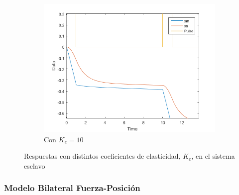 \documentclass[a4paper, fontsize=11pt]{scrartcl} %
\numberwithin{equation}{section} %
\numberwithin{figure}{section} %
\numberwithin{table}{section} %
\begin{document}
\begin{figure}[h!]
\begin{subfigure}[t]{.5\textwidth}
			\includegraphics[width=1\linewidth]{images/Ke10.PNG}
			\caption{Con $K_e = 10$}
			\label{Ke10}
		\end{subfigure}
		\caption{Respuestas con distintos coeficientes de elasticidad, $K_e$, en el sistema esclavo}
		\label{Slave_Stifnes}
	\end{figure}
	\FloatBarrier
	
	\pagebreak
	
	\subsubsection{Modelo Bilateral Fuerza-Posición}
	
\end{document}
